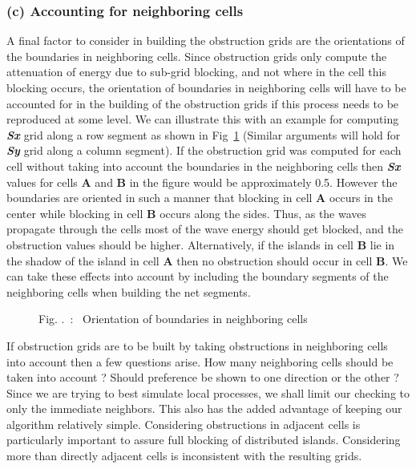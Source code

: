 \documentclass[12pt]{article}
\newcounter{myfigno}[section]
\newenvironment{myfig}[1]{\begin{figure}[#1]
                        \refstepcounter{myfigno}}
                       {\end{figure}}
\newcommand{\myfcapc}[1]{\begin{center} \ff Fig. \themyfigno\ :~ #1
                        \end{center}}
\renewcommand{\themyfigno}{\thesection.\arabic{myfigno}}
\begin{document}
\subsubsection*{(c) Accounting for neighboring cells}
A final factor to consider in building the obstruction grids are the orientations of the boundaries in neighboring cells. Since obstruction grids only compute the attenuation of energy due to sub-grid blocking, and not where in the cell this blocking occurs, the orientation of boundaries in neighboring cells will have to be accounted for in the building of the obstruction grids if this process needs to be reproduced at some level. We can illustrate this with an example for computing \textbf{\textit{Sx}} grid along a row segment as shown in Fig~\ref{fig:subgrid4} (Similar arguments will hold for \textbf{\textit{Sy}} grid along a column segment). If the obstruction grid was computed for each cell without taking into account the boundaries in the neighboring cells then \textbf{\textit{Sx}} values for cells {\bf A} and {\bf B} in the figure would be approximately 0.5. However the boundaries are oriented in such a manner that blocking in cell {\bf A} occurs in the center while blocking in cell {\bf B} occurs along the sides. Thus, as the waves propagate through the cells most of the wave energy should get blocked, and the obstruction values should be higher. Alternatively, if the islands in cell {\bf B} lie in the shadow of the island in cell {\bf A} then no obstruction should occur in cell {\bf B}. We can take these effects into account by including the boundary segments of the neighboring cells when building the net segments. 

\begin{myfig}{tbp}
\centerline{}
\myfcapc{Orientation of boundaries in neighboring cells}
\label{fig:subgrid4}
\end{myfig}
 
If obstruction grids are to be built by taking obstructions in neighboring cells into account then a few questions arise. How many neighboring cells should be taken into account ? Should preference be shown to one direction or the other ? Since we are trying to best simulate local processes, we shall limit our checking to only the immediate neighbors. This also has the added advantage of keeping our algorithm relatively simple. Considering obstructions in adjacent cells is particularly important to assure full blocking of distributed islands. Considering more than directly adjacent cells is inconsistent with the resulting grids.
\end{document}
